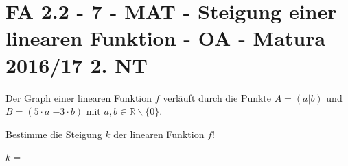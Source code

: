 \section{FA 2.2 - 7 - MAT - Steigung einer linearen Funktion - OA - Matura 2016/17 2. NT}

\begin{beispiel}[FA 2.2]{1} %
Der Graph einer linearen Funktion $f$ verläuft durch die Punkte $A=(a|b)$ und $B=(5\cdot a|-3\cdot b)$ mit $a,b\in\mathbb{R}\backslash\{0\}$.

Bestimme die Steigung $k$ der linearen Funktion $f$!\leer

$k=$\,
\end{beispiel}